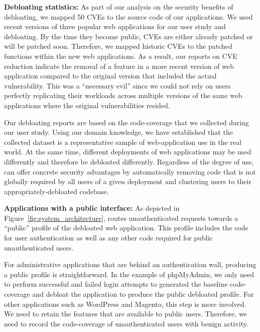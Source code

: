 
\noindent\textbf{Debloating statistics: }
As part of our analysis on the security benefits of debloating, we mapped 50 CVEs to the source code of our applications. 
We used recent versions of three popular web applications for our user study and debloating.
By the time they become public, CVEs are either already patched or will be patched soon. 
Therefore, we mapped historic CVEs to the patched functions within the new web applications. 
As a result, our reports on CVE reduction indicate the removal of a feature in a more recent version of web application compared to the original version that included the actual vulnerability. This was a ``necessary evil'' since we could not rely on users perfectly replicating their workloads across multiple versions of the same web applications where the original vulnerabilities resided.

Our debloating reports are based on the code-coverage that we collected during our user study. Using our domain knowledge, we have established that the collected dataset is a representative sample of web-application use in the real world. At the same time, different deployments of web applications may be used differently and therefore be debloated differently. Regardless of the degree of use, \sys{} can offer concrete security advantages by automatically removing code that is not globally required by all users of a given deployment and clustering users to their appropriately-debloated codebase.


\noindent\textbf{Applications with a public interface: }
As depicted in Figure~\ref{fig:system_architecture}, \sys{} routes unauthenticated requests towards a ``public'' profile of the debloated web application. 
This profile includes the code for user authentication as well as any other code required for public unauthenticated users. 

For administrative applications that are behind an authentication wall, producing a public profile is straightforward. 
In the example of phpMyAdmin, we only need to perform successful and failed login attempts to generated the baseline code-coverage and debloat the application to produce the public debloated profile. 
For other applications such as WordPress and Magento, this step is more involved. 
We need to retain the features that are available to public users. 
Therefore, we need to record the code-coverage of unauthenticated users with benign activity. 

